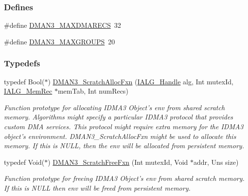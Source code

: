 \subsubsection*{Defines}
\begin{CompactItemize}
\item 
\#define \hyperlink{group___d_s_p_d_m_a_n3_gc5bb90e4340386e641863309330e4fb5}{DMAN3\_\-MAXDMARECS}~32
\item 
\#define \hyperlink{group___d_s_p_d_m_a_n3_gb4a261c271c8d0f1e9843eada6b263e8}{DMAN3\_\-MAXGROUPS}~20
\end{CompactItemize}
\subsubsection*{Typedefs}
\begin{CompactItemize}
\item 
typedef Bool($\ast$) \hyperlink{group___d_s_p_d_m_a_n3_gb88a4f4fc347844728e7c0d6b46c5ecf}{DMAN3\_\-Scratch\-Alloc\-Fxn} (\hyperlink{struct_i_a_l_g___obj}{IALG\_\-Handle} alg, Int mutex\-Id, \hyperlink{struct_i_a_l_g___mem_rec}{IALG\_\-Mem\-Rec} $\ast$mem\-Tab, Int num\-Recs)
\begin{CompactList}\small\item\em Function prototype for allocating IDMA3 Object's env from shared scratch memory. Algorithms might specify a particular IDMA3 protocol that provides custom DMA services. This protocol might require extra memory for the IDMA3 object's environment. DMAN3\_\-Scratch\-Alloc\-Fxn might be used to allocate this memory. If this is NULL, then the env will be allocated from persistent memory. \item\end{CompactList}\item 
typedef Void($\ast$) \hyperlink{group___d_s_p_d_m_a_n3_g5c51dee2c06d775005a8cf4db004782f}{DMAN3\_\-Scratch\-Free\-Fxn} (Int mutex\-Id, Void $\ast$addr, Uns size)
\begin{CompactList}\small\item\em Function prototype for freeing IDMA3 Object's env from shared scratch memory. If this is NULL then env will be freed from persistent memory. \item\end{CompactList}\end{CompactItemize}
